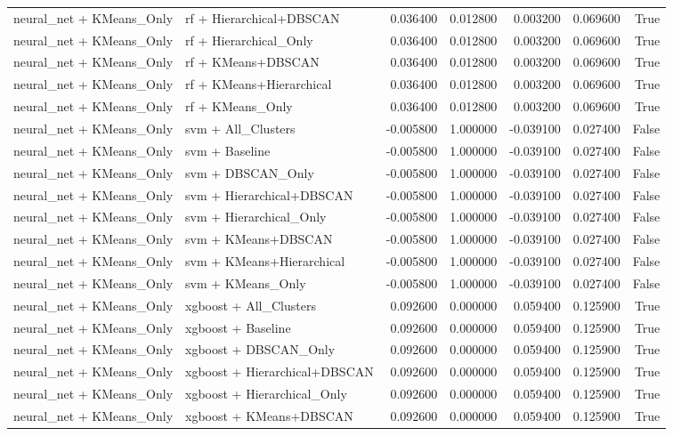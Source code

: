 \begin{tabular}{llrrrrr}
neural_net + KMeans_Only & rf + Hierarchical+DBSCAN & 0.036400 & 0.012800 & 0.003200 & 0.069600 & True \\
neural_net + KMeans_Only & rf + Hierarchical_Only & 0.036400 & 0.012800 & 0.003200 & 0.069600 & True \\
neural_net + KMeans_Only & rf + KMeans+DBSCAN & 0.036400 & 0.012800 & 0.003200 & 0.069600 & True \\
neural_net + KMeans_Only & rf + KMeans+Hierarchical & 0.036400 & 0.012800 & 0.003200 & 0.069600 & True \\
neural_net + KMeans_Only & rf + KMeans_Only & 0.036400 & 0.012800 & 0.003200 & 0.069600 & True \\
neural_net + KMeans_Only & svm + All_Clusters & -0.005800 & 1.000000 & -0.039100 & 0.027400 & False \\
neural_net + KMeans_Only & svm + Baseline & -0.005800 & 1.000000 & -0.039100 & 0.027400 & False \\
neural_net + KMeans_Only & svm + DBSCAN_Only & -0.005800 & 1.000000 & -0.039100 & 0.027400 & False \\
neural_net + KMeans_Only & svm + Hierarchical+DBSCAN & -0.005800 & 1.000000 & -0.039100 & 0.027400 & False \\
neural_net + KMeans_Only & svm + Hierarchical_Only & -0.005800 & 1.000000 & -0.039100 & 0.027400 & False \\
neural_net + KMeans_Only & svm + KMeans+DBSCAN & -0.005800 & 1.000000 & -0.039100 & 0.027400 & False \\
neural_net + KMeans_Only & svm + KMeans+Hierarchical & -0.005800 & 1.000000 & -0.039100 & 0.027400 & False \\
neural_net + KMeans_Only & svm + KMeans_Only & -0.005800 & 1.000000 & -0.039100 & 0.027400 & False \\
neural_net + KMeans_Only & xgboost + All_Clusters & 0.092600 & 0.000000 & 0.059400 & 0.125900 & True \\
neural_net + KMeans_Only & xgboost + Baseline & 0.092600 & 0.000000 & 0.059400 & 0.125900 & True \\
neural_net + KMeans_Only & xgboost + DBSCAN_Only & 0.092600 & 0.000000 & 0.059400 & 0.125900 & True \\
neural_net + KMeans_Only & xgboost + Hierarchical+DBSCAN & 0.092600 & 0.000000 & 0.059400 & 0.125900 & True \\
neural_net + KMeans_Only & xgboost + Hierarchical_Only & 0.092600 & 0.000000 & 0.059400 & 0.125900 & True \\
neural_net + KMeans_Only & xgboost + KMeans+DBSCAN & 0.092600 & 0.000000 & 0.059400 & 0.125900 & True \\

\end{tabular}
